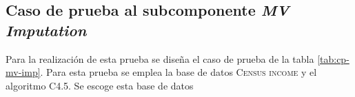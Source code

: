 \subsection{Caso de prueba al subcomponente \textit{MV Imputation}}
Para la realización de esta prueba se diseña el caso de prueba de la tabla \ref{tab:cp-mv-imp}. Para esta prueba se emplea la base de datos \textsc{Census income} y el algoritmo C4.5. Se escoge esta base de datos 

\begin{table}[H]
	\centering
	\caption{Caso de prueba al componente \textit{MV Imputation}}
	\label{tab:cp-mv-imp}
	\begin{spacing}{1.15}
\end{spacing}
\end{table}
